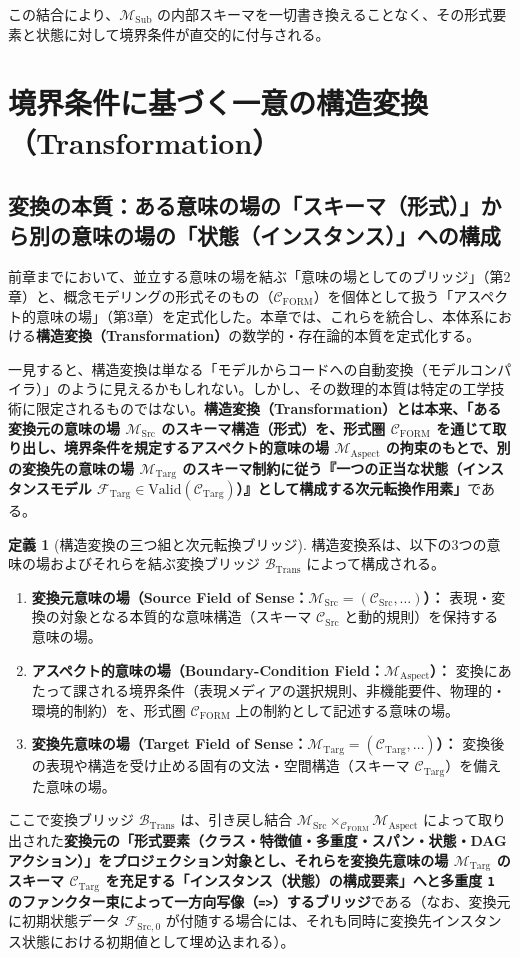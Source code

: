 \documentclass[11pt,a4paper]{ltjsarticle}
\theoremstyle{definition}
\newtheorem{definition}{定義}[section]
\theoremstyle{plain}
\theoremstyle{remark}
\newcommand{\Valid}{\mathrm{Valid}}
\newcommand{\CFORM}{\mathcal{C}_{\mathrm{FORM}}}
\newcommand{\CSrc}{\mathcal{C}_{\mathrm{Src}}}
\newcommand{\CTarg}{\mathcal{C}_{\mathrm{Targ}}}
\newcommand{\MSrc}{\mathcal{M}_{\mathrm{Src}}}
\newcommand{\MTarg}{\mathcal{M}_{\mathrm{Targ}}}
\newcommand{\MAspect}{\mathcal{M}_{\mathrm{Aspect}}}
\newcommand{\MSub}{\mathcal{M}_{\mathrm{Sub}}}
\newcommand{\BTrans}{\mathcal{B}_{\mathrm{Trans}}}
\begin{document}
この結合により、$\MSub$ の内部スキーマを一切書き換えることなく、その形式要素と状態に対して境界条件が直交的に付与される。
\section{境界条件に基づく一意の構造変換（Transformation）}

\subsection{変換の本質：ある意味の場の「スキーマ（形式）」から別の意味の場の「状態（インスタンス）」への構成}
前章までにおいて、並立する意味の場を結ぶ「意味の場としてのブリッジ」（第2章）と、概念モデリングの形式そのもの（$\CFORM$）を個体として扱う「アスペクト的意味の場」（第3章）を定式化した。本章では、これらを統合し、本体系における\textbf{構造変換（Transformation）}の数学的・存在論的本質を定式化する。

一見すると、構造変換は単なる「モデルからコードへの自動変換（モデルコンパイラ）」のように見えるかもしれない。しかし、その数理的本質は特定の工学技術に限定されるものではない。\textbf{構造変換（Transformation）とは本来、「ある変換元の意味の場 $\MSrc$ のスキーマ構造（形式）を、形式圏 $\CFORM$ を通じて取り出し、境界条件を規定するアスペクト的意味の場 $\MAspect$ の拘束のもとで、別の変換先の意味の場 $\MTarg$ のスキーマ制約に従う『一つの正当な状態（インスタンスモデル $\mathcal{F}_{\mathrm{Targ}} \in \Valid(\CTarg)$）』として構成する次元転換作用素」}である。

\begin{definition}[構造変換の三つ組と次元転換ブリッジ]\label{def:transformation-triple}
構造変換系は、以下の3つの意味の場およびそれらを結ぶ変換ブリッジ $\BTrans$ によって構成される。
\begin{enumerate}
    \item \textbf{変換元意味の場（Source Field of Sense：$\MSrc = (\CSrc, \dots)$）：} 表現・変換の対象となる本質的な意味構造（スキーマ $\CSrc$ と動的規則）を保持する意味の場。
    \item \textbf{アスペクト的意味の場（Boundary-Condition Field：$\MAspect$）：} 変換にあたって課される境界条件（表現メディアの選択規則、非機能要件、物理的・環境的制約）を、形式圏 $\CFORM$ 上の制約として記述する意味の場。
    \item \textbf{変換先意味の場（Target Field of Sense：$\MTarg = (\CTarg, \dots)$）：} 変換後の表現や構造を受け止める固有の文法・空間構造（スキーマ $\CTarg$）を備えた意味の場。
\end{enumerate}

ここで変換ブリッジ $\BTrans$ は、引き戻し結合 $\MSrc \times_{\CFORM} \MAspect$ によって取り出された\textbf{変換元の「形式要素（クラス・特徴値・多重度・スパン・状態・DAG アクション）」をプロジェクション対象とし、それらを変換先意味の場 $\MTarg$ のスキーマ $\CTarg$ を充足する「インスタンス（状態）の構成要素」へと多重度 \texttt{1} のファンクター束によって一方向写像（\texttt{=>}）するブリッジ}である（なお、変換元に初期状態データ $\mathcal{F}_{\mathrm{Src}, 0}$ が付随する場合には、それも同時に変換先インスタンス状態における初期値として埋め込まれる）。
\end{definition}
\end{document}
